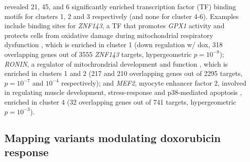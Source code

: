 \documentclass[9pt,lineno]{elife}
\begin{document}
revealed 21, 45, and 6 significantly enriched transcription factor (TF) binding motifs for clusters 1, 2 and 3 respectively (and none for cluster 4-6). Examples include binding sites for \emph{ZNF143}, a TF that promotes \emph{GPX1} activity and protects cells from oxidative damage during mitochondrial respiratory dysfunction \citep{Lu2012}, which is enriched in cluster 1 (down regulation w/ dox, 318 overlapping genes out of 3555 \emph{ZNF143} targets, hypergeometric $p=10^{-8}$); \emph{RONIN}, a regulator of mitochrondrial development and function \citep{Poche2016}, which is enriched in clusters 1 and 2 (217 and 210 overlapping genes out of 2295 targets, $p=10^{-7}$ and $10^{-4}$ respectively); and \emph{MEF2}, myocyte enhancer factor 2, involved in regulating muscle development, stress-response and p38-mediated apoptosis \citep{Zarubin2005}, enriched in cluster 4 (32 overlapping genes out of 741 targets, hypergeometric $p=10^{-3}$). 

\subsection*{Mapping variants modulating doxorubicin response}
\end{document}
